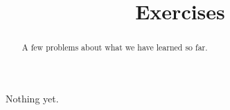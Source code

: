 \documentclass{ximera}
\title{Exercises}
\begin{document}
\begin{abstract}
A few problems about what we have learned so far.
\end{abstract}
\maketitle


Nothing yet.
\end{document}
